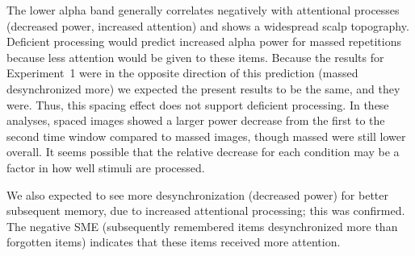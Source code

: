 

The lower alpha band generally correlates negatively with attentional processes (decreased power, increased attention) and shows a widespread scalp topography.  Deficient processing would predict increased alpha power for massed repetitions because less attention would be given to these items.  Because the results for Experiment~1 were in the opposite direction of this prediction (massed desynchronized more) we expected the present results to be the same, and they were.  Thus, this spacing effect does not support deficient processing.  In these analyses, spaced images showed a larger power decrease from the first to the second time window compared to massed images, though massed were still lower overall.  It seems possible that the relative decrease for each condition may be a factor in how well stimuli are processed.

We also expected to see more desynchronization (decreased power) for better subsequent memory, due to increased attentional processing; this was confirmed.
The negative SME (subsequently remembered items desynchronized more than forgotten items) indicates that these items received more attention.



